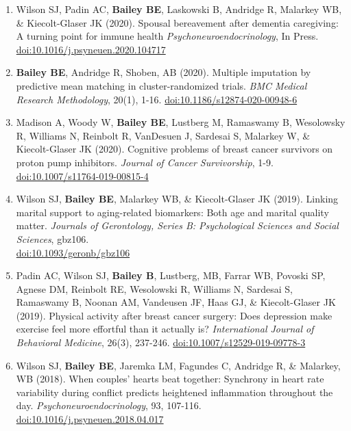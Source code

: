 \documentclass[
  fleqn, oneside]{article}
\begin{document}
\begin{enumerate}
\def\labelenumi{\arabic{enumi}.}
\item
  Wilson SJ, Padin AC, \textbf{Bailey BE}, Laskowski B, Andridge R,
  Malarkey WB, \& Kiecolt-Glaser JK (2020). Spousal bereavement after
  dementia caregiving: A turning point for immune health
  \emph{Psychoneuroendocrinology}, In Press.
  \href{https://doi.org/10.1016/j.psyneuen.2020.104717}{doi:10.1016/j.psyneuen.2020.104717}
\item
  \textbf{Bailey BE}, Andridge R, Shoben, AB (2020). Multiple imputation
  by predictive mean matching in cluster-randomized trials. \emph{BMC
  Medical Research Methodology}, 20(1), 1-16.
  \href{https://doi.org/10.1186/s12874-020-00948-6}{doi:10.1186/s12874-020-00948-6}
\item
  Madison A, Woody W, \textbf{Bailey BE}, Lustberg M, Ramaswamy B,
  Wesolowsky R, Williams N, Reinbolt R, VanDesuen J, Sardesai S,
  Malarkey W, \& Kiecolt-Glaser JK (2020). Cognitive problems of breast
  cancer survivors on proton pump inhibitors. \emph{Journal of Cancer
  Survivorship}, 1-9.
  \href{https://doi.org/10.1007/s11764-019-00815-4}{doi:10.1007/s11764-019-00815-4}
\item
  Wilson SJ, \textbf{Bailey BE}, Malarkey WB, \& Kiecolt-Glaser JK
  (2019). Linking marital support to aging-related biomarkers: Both age
  and marital quality matter. \emph{Journals of Gerontology, Series B:
  Psychological Sciences and Social Sciences}, gbz106.\\
  \href{https://doi.org/10.1093/geronb/gbz106}{doi:10.1093/geronb/gbz106}
\item
  Padin AC, Wilson SJ, \textbf{Bailey B}, Lustberg, MB, Farrar WB,
  Povoski SP, Agnese DM, Reinbolt RE, Wesolowski R, Williams N, Sardesai
  S, Ramaswamy B, Noonan AM, Vandeusen JF, Haas GJ, \& Kiecolt-Glaser JK
  (2019). Physical activity after breast cancer surgery: Does depression
  make exercise feel more effortful than it actually is?
  \emph{International Journal of Behavioral Medicine}, 26(3), 237-246.
  \href{https://doi.org/10.1007/s12529-019-09778-3}{doi:10.1007/s12529-019-09778-3}
\item
  Wilson SJ, \textbf{Bailey BE}, Jaremka LM, Fagundes C, Andridge R, \&
  Malarkey, WB (2018). When couples' hearts beat together: Synchrony in
  heart rate variability during conflict predicts heightened
  inflammation throughout the day. \emph{Psychoneuroendocrinology}, 93,
  107-116.
  \href{https://doi.org/10.1016/j.psyneuen.2018.04.017}{doi:10.1016/j.psyneuen.2018.04.017}

\end{enumerate}
\end{document}
